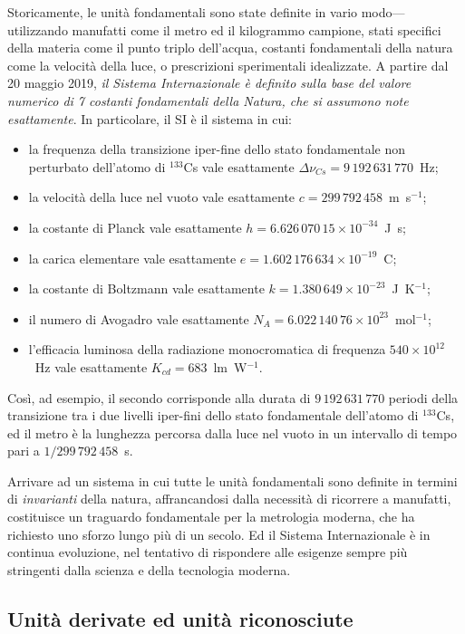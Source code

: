 Storicamente, le unità fondamentali sono state definite in vario modo---utilizzando
manufatti come il metro ed il kilogrammo campione, stati specifici della
materia come il punto triplo dell'acqua, costanti fondamentali della natura come
la velocità della luce, o prescrizioni sperimentali idealizzate.
A partire dal 20 maggio 2019, \emph{il Sistema Internazionale è definito sulla
base del valore numerico di 7 costanti fondamentali della Natura, che si
assumono note esattamente}. In particolare, il SI è il sistema in cui:
\begin{itemize}
\item la frequenza della transizione iper-fine dello stato fondamentale non
  perturbato dell'atomo di $^{133}$Cs vale esattamente
  $\Delta\nu_{Cs} = 9\,192\,631\,770$~Hz;
\item la velocità della luce nel vuoto vale esattamente $c = 299\,792\,458$~m~s$^{-1}$;
\item la costante di Planck vale esattamente $h = 6.626\,070\,15 \times 10^{-34}$~J~s;
\item la carica elementare vale esattamente $e = 1.602\,176\,634 \times 10^{-19}$~C;
\item la costante di Boltzmann vale esattamente $k = 1.380\,649 \times 10^{-23}$~J~K$^{-1}$;
\item il numero di Avogadro vale esattamente $N_A = 6.022\,140\,76 \times 10^{23}$~mol$^{-1}$;
\item l'efficacia luminosa della radiazione monocromatica di frequenza
  $540 \times 10^{12}$~Hz vale esattamente $K_{cd} = 683$~lm~W$^{-1}$.
\end{itemize}
Così, ad esempio, il secondo corrisponde alla durata di $9\,192\,631\,770$
periodi della transizione tra i due livelli iper-fini dello stato fondamentale
dell'atomo di $^{133}$Cs, ed il metro è la lunghezza percorsa dalla luce nel
vuoto in un intervallo di tempo pari a $1/299\,792\,458$~s.

Arrivare ad un sistema in cui tutte le unità fondamentali sono definite in
termini di \emph{invarianti} della natura, affrancandosi dalla necessità di
ricorrere a manufatti, costituisce un traguardo fondamentale per la metrologia
moderna, che ha richiesto uno sforzo lungo più di un secolo.
Ed il Sistema Internazionale è in continua evoluzione, nel tentativo di rispondere
alle esigenze sempre più stringenti dalla scienza e della tecnologia moderna.


\subsection{Unità derivate ed unità riconosciute}

